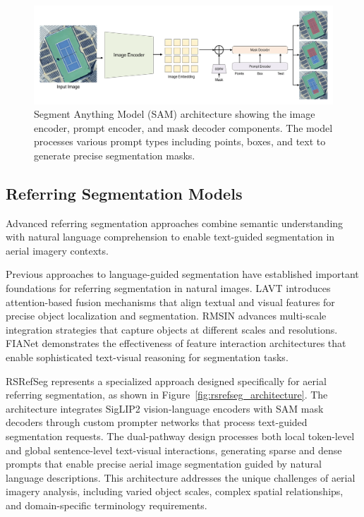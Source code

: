 \begin{figure}[htbp]
\centering
\includegraphics[width=1.0\textwidth]{Images/sam.png}
\caption{Segment Anything Model (SAM) architecture showing the image encoder, prompt encoder, and mask decoder components. The model processes various prompt types including points, boxes, and text to generate precise segmentation masks.}
\label{fig:sam_architecture}
\end{figure}

\subsection{Referring Segmentation Models}

Advanced referring segmentation approaches combine semantic understanding with natural language comprehension to enable text-guided segmentation in aerial imagery contexts.

Previous approaches to language-guided segmentation have established important foundations for referring segmentation in natural images. LAVT introduces attention-based fusion mechanisms that align textual and visual features for precise object localization and segmentation. RMSIN advances multi-scale integration strategies that capture objects at different scales and resolutions. FIANet demonstrates the effectiveness of feature interaction architectures that enable sophisticated text-visual reasoning for segmentation tasks.

RSRefSeg represents a specialized approach designed specifically for aerial referring segmentation, as shown in Figure~\ref{fig:rsrefseg_architecture}. The architecture integrates SigLIP2 vision-language encoders with SAM mask decoders through custom prompter networks that process text-guided segmentation requests. The dual-pathway design processes both local token-level and global sentence-level text-visual interactions, generating sparse and dense prompts that enable precise aerial image segmentation guided by natural language descriptions. This architecture addresses the unique challenges of aerial imagery analysis, including varied object scales, complex spatial relationships, and domain-specific terminology requirements.

